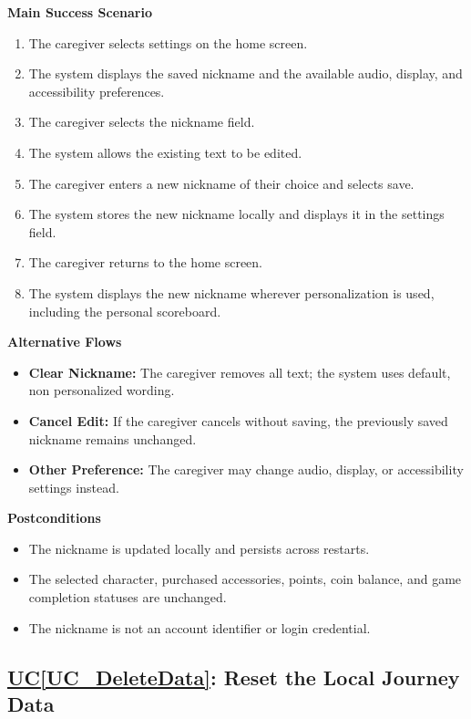 \documentclass[12pt]{article}
\newcounter{ucnum} %
\newcommand{\ucref}[1]{\hyperref[#1]{UC\ref*{#1}}}
\begin{document}
\textbf{Main Success Scenario}
\begin{enumerate}
    \item The caregiver selects settings on the home screen.
    \item The system displays the saved nickname and the
    available audio, display, and accessibility preferences.
    \item The caregiver selects the nickname field.
    \item The system allows the existing text to be edited.
    \item The caregiver enters a new nickname of their choice
    and selects save.
    \item The system stores the new nickname locally and
    displays it in the settings field.
    \item The caregiver returns to the home screen.
    \item The system displays the new nickname wherever
    personalization is used, including the personal scoreboard.
\end{enumerate}

\textbf{Alternative Flows}
\begin{itemize}
    \item \textbf{Clear Nickname:} The caregiver removes all text;
    the system uses default, non personalized wording.
    \item \textbf{Cancel Edit:} If the caregiver cancels without saving,
    the previously saved nickname remains unchanged.
    \item \textbf{Other Preference:} The caregiver may change
    audio, display, or accessibility settings instead.
\end{itemize}

\textbf{Postconditions}
\begin{itemize}
    \item The nickname is updated locally and persists across restarts.
    \item The selected character, purchased accessories, points,
    coin balance, and game completion statuses are unchanged.
    \item The nickname is not an account identifier or login credential.
\end{itemize}

\label{UC_DeleteData}
\subsection{\ucref{UC_DeleteData}: Reset the Local Journey Data}
\end{document}
